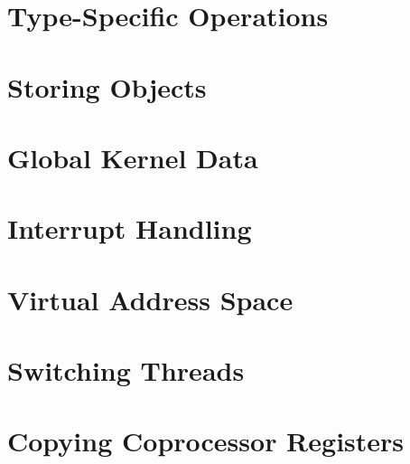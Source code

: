 \documentclass{ertos-book}
\begin{document}
\section{Type-Specific Operations}


\section{Storing Objects}


\section{Global Kernel Data}


\section{Interrupt Handling}


\section{Virtual Address Space}


\section{Switching Threads}


\section{Copying Coprocessor Registers}

\end{document}
